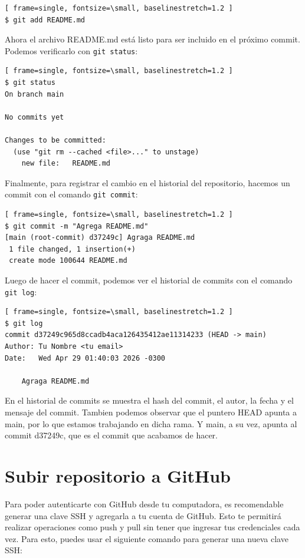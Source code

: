 \documentclass[a4paper,12pt]{report}
\begin{document}
\begin{Verbatim}[ frame=single, fontsize=\small, baselinestretch=1.2 ]
$ git add README.md
\end{Verbatim}

Ahora el archivo README.md está listo para ser incluido en el próximo commit. Podemos verificarlo con \texttt{git status}:

\begin{Verbatim}[ frame=single, fontsize=\small, baselinestretch=1.2 ]
$ git status
On branch main

No commits yet

Changes to be committed:
  (use "git rm --cached <file>..." to unstage)
	new file:   README.md
\end{Verbatim}

Finalmente, para registrar el cambio en el historial del repositorio, hacemos un commit con el comando \texttt{git commit}:
\begin{Verbatim}[ frame=single, fontsize=\small, baselinestretch=1.2 ]
$ git commit -m "Agrega README.md"
[main (root-commit) d37249c] Agraga README.md
 1 file changed, 1 insertion(+)
 create mode 100644 README.md
\end{Verbatim}

Luego de hacer el commit, podemos ver el historial de commits con el comando \texttt{git log}:
\begin{Verbatim}[ frame=single, fontsize=\small, baselinestretch=1.2 ]
$ git log
commit d37249c965d8ccadb4aca126435412ae11314233 (HEAD -> main)
Author: Tu Nombre <tu email>
Date:   Wed Apr 29 01:40:03 2026 -0300

    Agraga README.md

\end{Verbatim}

En el historial de commits se muestra el hash del commit, el autor, la fecha y el mensaje del commit.
Tambien podemos observar que el puntero HEAD apunta a main, por lo que estamos trabajando en dicha rama.
Y main, a su vez, apunta al commit d37249c, que es el commit que acabamos de hacer.

\section{Subir repositorio a GitHub}
Para poder autenticarte con GitHub desde tu computadora, es recomendable generar una clave SSH y agregarla a tu cuenta
de GitHub. Esto te permitirá realizar operaciones como push y pull sin tener que ingresar tus credenciales cada vez.
Para esto, puedes usar el siguiente comando para generar una nueva clave SSH:
\end{document}
